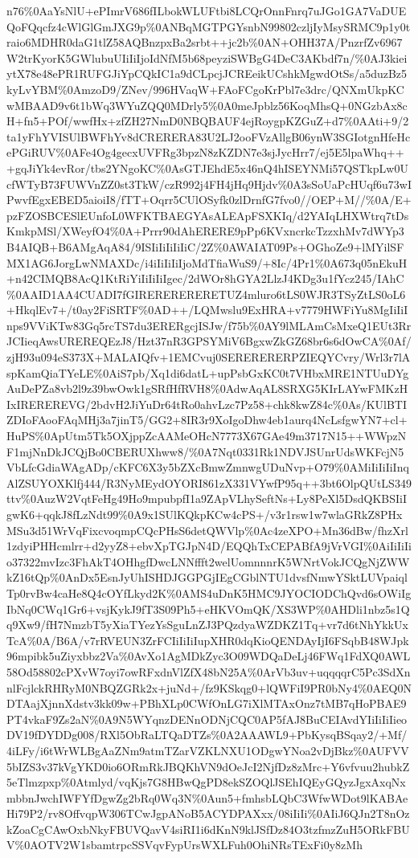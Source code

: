 \documentclass[]{article}
\begin{document}
n76\%0AaYsNlU+ePImrV686fILbokWLUFtbi8LCQrOnnFnrq7uJGo1GA7VaDUEQoFQqcfz4cWlGlGmJXG9p\%0ANBqMGTPGYsnbN99802czljIyMsySRMC9p1y0traio6MDHR0daG1tlZ58AQBnzpxBa2srbt++jc2b\%0AN+OHH37A/PnzrfZv6967W2trKyorK5GWlubuUIiIiIjoIdNfM5b68peyziSWBgG4DeC3AKbdf7n/\%0AJ3kieiytX78e48ePR1RUFGJiYpCQkIC1a9dCLpcjJCREeikUCshkMgwdOtSs/a5duzBz5kyLvYBM\%0AmzoD9/ZNev/996HVaqW+FAoFCgoKrPbl7e3drc/QNXmUkpKCwMBAAD9v6t1bWq3WYuZQQ0MDrly5\%0A0meJpblz56KoqMhsQ+0NGzbAx8cH+fn5+POf/wwfHx+zfZH27NmD0NBQBAUF4ejRoygpKZGuZ+d7\%0AAti+9/2ta1yFhYVISUlBWFhYv8dCRERERA83U2LJ2ooFVzAllgB06ynW3SGIotgnHfeHcePGiRUV\%0AFe4Og4gecxUVFRg3bpzN8zKZDN7e3sjJycHrr7/ej5E5lpaWhq+++gqJiYk4evRor/tbs2YNgoKC\%0AsGTJEhdE5x46nQ4hISEYNMi57QSTkpLw0UcfWTyB73FUWVnZZ0st3TkW/czR992j4FH4jHq9Hjdv\%0A3sSoUaPcHUqf6u73wIPwvfEgxEBED5aioiI8/fTT+Oqrr5CUlOSyfk0zlDrnfG7fvo0//OEP+M//\%0A/E+pzFZOSBCESlEUnfoL0WFKTBAEGYAsALEApFSXKIq/d2YAIqLHXWtrq7tDsKmkpMSl/XWeyfO4\%0A+Prrr90dAhERERE9pPp6KVxncrkcTzzxhMv7dWYp3B4AIQB+B6AMgAqA84/9ISIiIiIiIiIiC/2Z\%0AWAIAT09Ps+OGhoZe9+lMYilSFMX1AG6JorgLwNMAXDc/i4iIiIiIiIjoMdTfiaWuS9/+8Ic/4Pr1\%0A673q05nEkuH+n42CIMQB8AcQ1KtRiYiIiIiIiIgec/2dWOr8hGYA2LlzJ4KDg3u1fYcz245/IAhC\%0AAID1AA4CUADI7fGIRERERERERETUZ4mluro6tLS0WJR3TSyZtLS0oL6+HkqlEv7+/t0ay2FiSRTF\%0AD++/LQMwslu9ExHRA+v7779HWFiYu8MgIiIiInps9VViKTw83Gq5rcTS7du3ERERgcjISJw/f75b\%0AY9lMLAmCsMxeQ1EUt3RrJCIieqAwsUREREQEzJ8/Hzt37nR3GPSYMiV6BgxwZkGZ68br6s6dOwCA\%0Af/zjH93u094eS373X+MALAIQfv+1EMCvuj0SERERERERPZIEQYCvry/Wrl3r7lAspKamQiaTYeLE\%0AiS7pb/Xq1di6datL+upPsbGxKC0t7VHbxMRE1NTUuDYgAuDePZa8vb2l9z39bwOwk1gSRfHfRVH8\%0AdwAqAL8SRXG5KIrLAYwFMKzHIxIREREREVG/2bdvH2JiYuDr64tRo0ahvLzc7Pz58+chk8kwZ84c\%0As/KUlBTIZDIoFAooFAqMHj3a7jinT5/GG2+8IR3r9XoIgoDhw4eb1aurq4NcLsfgwYN7+cl+HuPS\%0ApUtm5Tk5OXjppZcAAMeOHcN7773X67GAe49m3717N15++WWpzNF1mjNnDkJCQjBo0CBERUXhww8/\%0A7Nqt0331Rk1NDVJSUnrUdsWKFcjN5VbLfcGdiaWAgADp/cKFC6X3y5bZXcBmwZmnwgUDuNvp+O79\%0AMiIiIiIiInqAlZSUYOXKlfj444/R3NyMEydOYORI861zX331VYwfP95q++3bt6OlpQUtLS349ttv\%0AuzW2VqtFeHg49Ho9mpubpfI1a9ZApVLhySeftNs+Ly8PeXl5DsdQKBSIiIgwK6+qqkJ8fLzNdt99\%0A9x1SUlKQkpKCw4cPS+/v3r1rsw1w7wlaGRkZ8PHxMSu3d51WrVqFixcvoqmpCQcPHsS6detQWVlp\%0Ac4zeXPO+Mn36dBw/fhzXrl1zdyiPHHcmlrr+d2yyZ8+ebvXpTGJpN4D/EQQhTxCEPABfA9jVrVGI\%0AiIiIiIio37322mvIzc3FhAkT4OHhgfDwcLNNffft2welUomnnnrK5WNrtVokJCQgNjZWWkZ16tQp\%0AnDx5EsnJyUhISHDJGGPGjIEgCGblNTU1dvsfNmwYSktLUVpaiqlTp0rvBw4caHe8Q4cOYfLkyd2K\%0AMS4uDnK5HMC9JYOCIODChQvd6sOWiIgIbNq0CWq1Gr6+vsjKykJ9fT3S09Ph5+eHKVOmQK/XS3WP\%0AHDli1nbz5s1Qq9Xw9/fH7NmzbT5yXiaTYezYsSguLnZJ3PQzdyaWZDKZ1Tq+vr7d6tNhYkkUxTcA\%0A/B6A/v7rRVEUN3ZrFCIiIiIiIupXHR0dqKioQENDAyIjI6FSqbB48WJpk96mpibk5uZiyxbbz2Va\%0AvXo1AgMDkZyc3O09WDQaDeLj46FWq1FdXQ0AWL58Od58802cPXvW7oyi7owRFxdnVlZfX48bN25A\%0ArVb3uv+uqqqqrC5Pc3SdXnnlFcjlckRHRyM0NBQZGRk2x+juNd+/fz9KSkqg0+lQWFiI9PR0bNy4\%0AEQ0NDTAajXjnnXdstv3kk09w+PBhXLp0CWfOnLG7iXlMTAxOnz7tMB7qHoPBAE9PT4vkaF9Zs2aN\%0A9N5WYqnzDENnODNjCQC0AP5fAJ8BuCEIAvdYIiIiIiIieoDV19fDYDDg008/RXl5ObRaLTQaDTZs\%0A2AAAWL9+PbKysqBSqay2/+Mf/4iLFy/i6tWrWLBgAaZNm9atmTZarVZKLNXU1ODgwYNoa2vDjBkz\%0AUFVV5bIZS3v37kVgYKD0io6ORmRkJBQKhVN9dOeJcI2NjfDz8zMrc+Y6vfvuu2hubkZ5eTlmzpxp\%0Atmlyd/vqKjs7G8HBwQgPD8ekSZOQlJSEhIQEyGQyzJgxAxqNxmbbnJwchIWFYfDgwZg2bRq0Wq3N\%0Aun5+fmhsbLQbC3WfwWDot9lKABAeHi79P2/rv8OffvqpW306TCwJgpANoB5ACYDPAXxx/08iIiIi\%0AIiJ6QJn2T8nOzkZoaCgCAwOxbNkyFBUVQavV4siRI1i6dKnN9klJSfDz84O3tzfmzZuH5ORkFBUV\%0AOTV2W1sbamtrpcSSVqvFypUrsWXLFuh0OhiNRsTExFi0y8zMh
\end{document}
